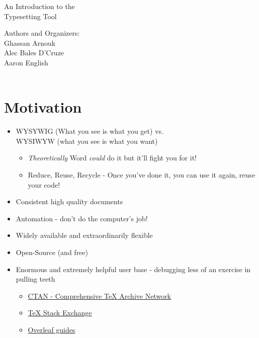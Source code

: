 \documentclass[hidelinks, 12pt]{article}%
\begin{document}
    \begin{center}
        \vspace*{1cm}
        {\fontsize{300}{50}\selectfont {\bfseries Hello \LaTeX\\}}
        \vspace{3cm}
        {\LARGE An Introduction to the\\
            Typesetting Tool\\}
        \vspace{8cm}
    \end{center}
    \begin{flushright}
        Authors and Organizers:\\
        Ghassan Arnouk\\
        Alec Bales D'Cruze\\
        Aaron English\\
        \\
    \end{flushright}
    \thispagestyle{empty}

    \clearpage
    \tableofcontents
    \clearpage
    \section{Motivation}
        \begin{itemize}
            \item WYSYWIG (What you see is what you get) vs.\\
                  WYSIWYW (what you see is what you want)
                  \begin{itemize}
                      \item \textit{Theoretically} Word \textit{could} do it but it'll fight you for it!
                      \item Reduce, Reuse, Recycle - Once you've done it, you can use it again, reuse your code!
                  \end{itemize}
            \item Consistent high quality documents
            \item Automation - don't do the computer's job!
            \item Widely available and extraordinarily flexible
            \item Open-Source (and free)
            \item Enormous and extremely helpful user base - debugging less of an exercise in pulling teeth
                \begin{itemize}
                    \item \href{https://www.ctan.org/}{CTAN - Comprehensive TeX Archive Network}
                    \item \href{https://tex.stackexchange.com/}{TeX Stack Exchange}
                    \item \href{https://www.overleaf.com/learn}{Overleaf guides}
                \end{itemize}
        \end{itemize}
\end{document}
